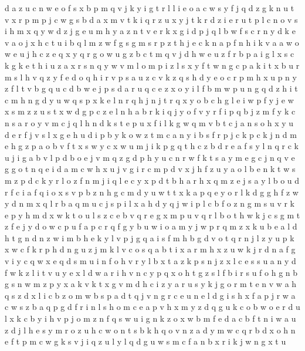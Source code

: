\documentclass{article}
\begin{document}
d a z u c n w e o f s x b p m q v j k y i g t r l
l i e o a c w s y f j q d z g k n u t v x r p m
p j c w g s b d a x m v t k i q r z u
x y j t k r d z i e
r u t p l c n o v s i h m x q y w d z j g e
u m h y a z n t v e r k x g i d p j q l b w f s c
r n y d k e v a o j x h c t u i b q l m z w f g s
g m s r p z t h j e c k n
a
p f n h i k v a
a w o
w e u
j h c z e q x
y q r g o w u
g z b c
t m q v j d h w e u z f r b p a i g l x s c k
g k e t h i u z a x r s n q y w v m l
o m p i z l s x y f t w
n g c p a k i t x b u r m s l h v q z y f e d
o q h i r v p s a u z c
v k z q s h d y e o c r p
m h x u p n y z f l t v b
g q u c d b w e j p
s d a r u q c e z x o y i l f
b m w p u n g q d z h i t
c
m h n g d y u w q s p x
k e l n r q h j
n j t r q x y o b c h g l e i w p f
y j e
w x s m z
z
u s t x w d g p c z e l n h a b r k i q j y o f v
y r f i p
q b j z m f y k c n s
a r o y v m c j q l h n d k s t e p u x
f i l k g w q m v b t c j a n s o h x y u d e
r f j v s l x g e h u d i p b y k o w z t m c a n
y i b s f r p j c k
p c k
j n d m e h g z p a o b v f t x s w y c
x w u m j i k p g q t h c z b d r e a f s y l n
q
r c k u j i g a b v l p d
b o e j v m q z g d p h y u c n r w f k t s a
y m e g c j
n q v e g
g o t n q e i d a m c w h x u j v
g i r c m p d v x j h f z u y a o l b e n k t w
s m z p d c k y r l o
z f n m j i q l e c y x p d t b h a r
h x q m z e j s a y l b o u d r f c i
a f q i o x s v p b z n h g c m d y u w t
t x k
a p q e y o r l k d g
g h f z w y d n m x q l r b
a q m u c j s p i l
x a h d y q j w i p l c b f o z n g m s u v r k e
p y h m d x w k t o u l s z c e b v q r
e g x m p u v q r l b o t h w k j c
s g m t z f e j y d o w c p u
f a
p c r q f g y b u w i o a m
y j w p r q m z x k u b e a l d h t g n
d n z w i m b h e k y l v p j g q
a i s f m h b g d v o t q r n j l z y u p k x w c
f k
r p h d n g u z j m k l v c o s q a b t i x
a r m h x z u w k
j r d n a f g v
i y c q w x
e q d s m u i n f o h v r y l b x t a z k p
s n j z x l c
e
s
s u a n y d f w k z l i t v
u y e x l d w a r i h v n
c y p q x o h t g z s l f b i
r s u f o h g n b
g s n w m z p y x a k v
k t x g v m d h c i z y a r u s
y k j g o r m t e n v w a h q s z d x l i c
b
z o m w b s p a d t q j v n g r c e u
n e l d g i s h x f a p j r w
a c w s
z b a q p g d f r i n l s h o m c e
a p v h x m y z d q g u k c o b w
o
e r d u l x k c b y i h v p j o m z n f q s w
u i g n k z o x w b m f e d a c
b f t n i w a u z d j l h e s y m r
o z u h c
w o n t
s b k h q o v n z a d y m w
c q
r b d x o h n e f t p m c w g k s v j i q z u l y
l q d g u w s m c f a n b x
r i k j w n g x t u
\end{document}

